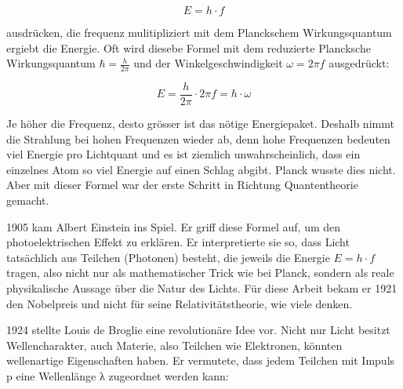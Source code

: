 	\begin{equation}
		E = h \cdot f
	\end{equation}
	
	 ausdrücken, die frequenz mulitipliziert mit dem Planckschem Wirkungsquantum ergiebt die Energie.
	 Oft wird diesebe Formel mit dem reduzierte Plancksche Wirkungsquantum $\hbar = \frac{h}{2\pi}$ und der Winkelgeschwindigkeit $\omega = 2 \pi f$ ausgedrückt:
	 
	 \begin{equation}
	  	E = \frac{h}{2\pi} \cdot 2\pi f = \hbar \cdot \omega
	 \end{equation}
	 
	 
	Je höher die Frequenz, desto grösser ist das nötige Energiepaket. 
	Deshalb nimmt die Strahlung bei hohen Frequenzen wieder ab, denn hohe Frequenzen bedeuten viel Energie pro Lichtquant und es ist ziemlich unwahrscheinlich, dass ein einzelnes Atom so viel Energie auf einen Schlag abgibt. 
	Planck wusste dies nicht. 
	Aber mit dieser Formel war der erste Schritt in Richtung  Quantentheorie gemacht.

	
	
	
	1905 kam Albert Einstein ins Spiel. 
	Er griff diese Formel auf, um den photoelektrischen Effekt zu erklären. 
	Er interpretierte sie so, dass Licht tatsächlich aus Teilchen (Photonen) besteht, die jeweils die Energie $E = h \cdot f$ tragen, also nicht nur als mathematischer Trick wie bei Planck, sondern als reale physikalische Aussage über die Natur des Lichts.
	Für diese Arbeit bekam er 1921 den Nobelpreis und nicht für seine Relativitätstheorie, wie viele denken.
	
	 
	
	

	
	1924 stellte Louis de Broglie eine revolutionäre Idee vor.
	Nicht nur Licht besitzt Wellencharakter, auch Materie, also Teilchen wie Elektronen, könnten wellenartige Eigenschaften haben.
	Er vermutete, dass jedem Teilchen mit Impuls p eine Wellenlänge λ zugeordnet werden kann:
	
